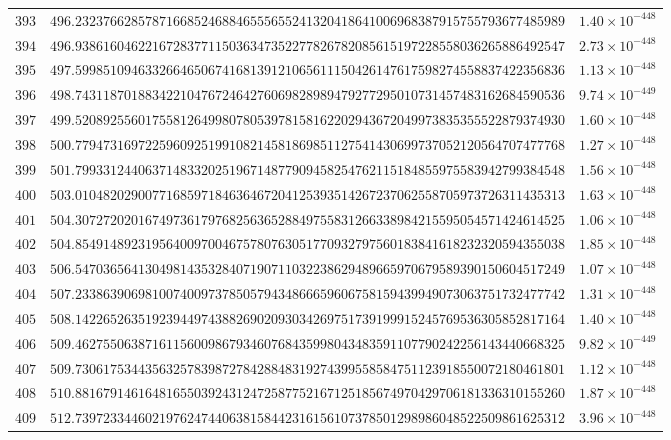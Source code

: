 \documentclass[12pt,reqno]{amsart}
\theoremstyle{remark}
\begin{document}
\begin{longtable}{clc}
$393$ & $496.2323766285787166852468846555655241320418641006968387915755793677485989$ & $1.40\times 10^{-448}$ \\
$394$ & $496.9386160462216728377115036347352277826782085615197228558036265886492547$ & $2.73\times 10^{-448}$ \\
$395$ & $497.5998510946332664650674168139121065611150426147617598274558837422356836$ & $1.13\times 10^{-448}$ \\
$396$ & $498.7431187018834221047672464276069828989479277295010731457483162684590536$ & $9.74\times 10^{-449}$ \\
$397$ & $499.5208925560175581264998078053978158162202943672049973835355522879374930$ & $1.60\times 10^{-448}$ \\
$398$ & $500.7794731697225960925199108214581869851127541430699737052120564707477768$ & $1.27\times 10^{-448}$ \\
$399$ & $501.7993312440637148332025196714877909458254762115184855975583942799384548$ & $1.56\times 10^{-448}$ \\
$400$ & $503.0104820290077168597184636467204125393514267237062558705973726311435313$ & $1.63\times 10^{-448}$ \\
$401$ & $504.3072720201674973617976825636528849755831266338984215595054571424614525$ & $1.06\times 10^{-448}$ \\
$402$ & $504.8549148923195640097004675780763051770932797560183841618232320594355038$ & $1.85\times 10^{-448}$ \\
$403$ & $506.5470365641304981435328407190711032238629489665970679589390150604517249$ & $1.07\times 10^{-448}$ \\
$404$ & $507.2338639069810074009737850579434866659606758159439949073063751732477742$ & $1.31\times 10^{-448}$ \\
$405$ & $508.1422652635192394497438826902093034269751739199915245769536305852817164$ & $1.40\times 10^{-448}$ \\
$406$ & $509.4627550638716115600986793460768435998043483591107790242256143440668325$ & $9.82\times 10^{-449}$ \\
$407$ & $509.7306175344356325783987278428848319274399558584751123918550072180461801$ & $1.12\times 10^{-448}$ \\
$408$ & $510.8816791461648165503924312472587752167125185674970429706181336310155260$ & $1.87\times 10^{-448}$ \\
$409$ & $512.7397233446021976247440638158442316156107378501298986048522509861625312$ & $3.96\times 10^{-448}$ \\

\end{longtable}
\end{document}
